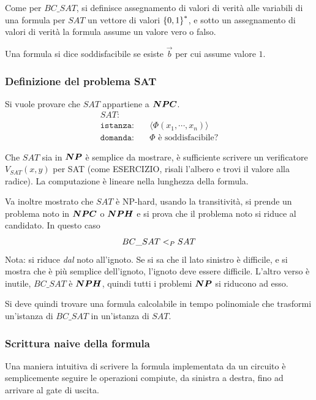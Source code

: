 Come per $BC\_SAT$, si definisce assegnamento di valori di verità alle variabili di una formula per $SAT$ un vettore di valori $\left\{0,1\right\}^{*}$, e sotto un assegnamento di valori di verità la formula assume un valore vero o falso.

Una formula si dice soddisfacibile se esiste $\vec{b}$ per cui assume valore $1$.

\subsubsection{Definizione del problema SAT}
Si vuole provare che $SAT$ appartiene a $\bm{NPC}$.
\begin{align*}
    SAT:& \\
    \texttt{istanza:} \quad & \langle \Phi \left( x_1, \cdots, x_n \right) \rangle \\
    \texttt{domanda:} \quad & \Phi \text{ è soddisfacibile?}
\end{align*}

Che $SAT$ sia in $\bm{NP}$ è semplice da mostrare, è sufficiente scrivere un verificatore $V_{SAT}(x,y)$ per SAT (come ESERCIZIO, risali l'albero e trovi il valore alla radice). La computazione è lineare nella lunghezza della formula.

Va inoltre mostrato che $SAT$ è NP-hard, usando la transitività, si prende un problema noto in $\bm{NPC}$ o $\bm{NPH}$ e si prova che il problema noto si riduce al candidato. In questo caso
\begin{equation*}
    BC\_SAT <_P SAT
\end{equation*}
Nota: si riduce \emph{dal} noto all'ignoto. Se si sa che il lato sinistro è difficile, e si mostra che è più semplice dell'ignoto, l'ignoto deve essere difficile. L'altro verso è inutile, $BC\_SAT$ è $\bm{NPH}$, quindi tutti i problemi $\bm{NP}$ si riducono ad esso.

Si deve quindi trovare una formula calcolabile in tempo polinomiale che trasformi un'istanza di $BC\_SAT$ in un'istanza di $SAT$.

\subsubsection{Scrittura naive della formula}


Una maniera intuitiva di scrivere la formula implementata da un circuito è semplicemente seguire le operazioni compiute, da sinistra a destra, fino ad arrivare al gate di uscita.

